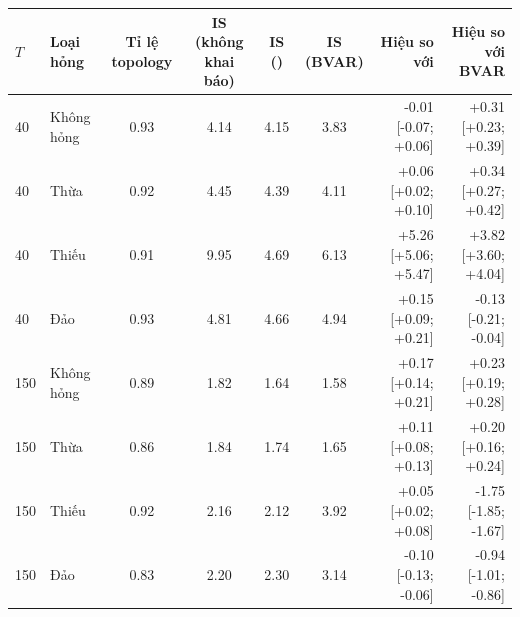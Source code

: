 \begin{tabular}{llccccrr}
\toprule
$T$ & Loại hỏng & Tỉ lệ topology & IS (không khai báo) & IS (\ours{}) & IS (BVAR) & Hiệu so với \ours{} & Hiệu so với BVAR\\
\midrule
40 & Không hỏng & 0.93 & 4.14 & 4.15 & 3.83 & -0.01 [-0.07; +0.06] & +0.31 [+0.23; +0.39] \\
40 & Thừa & 0.92 & 4.45 & 4.39 & 4.11 & +0.06 [+0.02; +0.10] & +0.34 [+0.27; +0.42] \\
40 & Thiếu & 0.91 & 9.95 & 4.69 & 6.13 & +5.26 [+5.06; +5.47] & +3.82 [+3.60; +4.04] \\
40 & Đảo & 0.93 & 4.81 & 4.66 & 4.94 & +0.15 [+0.09; +0.21] & -0.13 [-0.21; -0.04] \\
150 & Không hỏng & 0.89 & 1.82 & 1.64 & 1.58 & +0.17 [+0.14; +0.21] & +0.23 [+0.19; +0.28] \\
150 & Thừa & 0.86 & 1.84 & 1.74 & 1.65 & +0.11 [+0.08; +0.13] & +0.20 [+0.16; +0.24] \\
150 & Thiếu & 0.92 & 2.16 & 2.12 & 3.92 & +0.05 [+0.02; +0.08] & -1.75 [-1.85; -1.67] \\
150 & Đảo & 0.83 & 2.20 & 2.30 & 3.14 & -0.10 [-0.13; -0.06] & -0.94 [-1.01; -0.86] \\
\bottomrule
\end{tabular}
